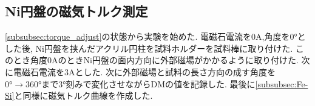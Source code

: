 \subsection{Ni円盤の磁気トルク測定}
\ref{subsubsec:torque_adjust}の状態から実験を始めた.
電磁石電流を$0\si{\ampere}$,角度を$0\si{\degree}$とした後,
Ni円盤を挟んだアクリル円柱を試料ホルダーを試料棒に取り付けた.
このとき角度$0\si{\ampere}$のときNi円盤の面内方向に外部磁場がかかるように取り付けた.
次に電磁石電流を$3\si{\ampere}$とした.
次に外部磁場と試料の長さ方向の成す角度を$0\si{\degree}\rightarrow360\si{\degree}$まで$3\si{\degree}$刻みで変化させながらDMの値を記録した.
最後に\ref{subsubsec:Fe-Si}と同様に磁気トルク曲線を作成した.
